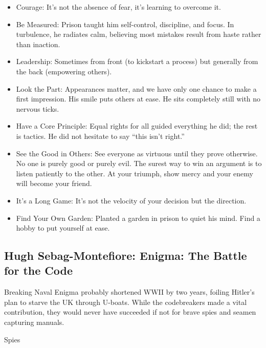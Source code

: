\documentclass[
]{article}
\begin{document}
\begin{itemize}
\item
  Courage: It's not the absence of fear, it's learning to overcome it.
\item
  Be Measured: Prison taught him self-control, discipline, and focus. In
  turbulence, he radiates calm, believing most mistakes result from
  haste rather than inaction.
\item
  Leadership: Sometimes from front (to kickstart a process) but
  generally from the back (empowering others).
\item
  Look the Part: Appearances matter, and we have only one chance to make
  a first impression. His smile puts others at ease. He sits completely
  still with no nervous ticks.
\item
  Have a Core Principle: Equal rights for all guided everything he did;
  the rest is tactics. He did not hesitate to say ``this isn't right.''
\item
  See the Good in Others: See everyone as virtuous until they prove
  otherwise. No one is purely good or purely evil. The surest way to win
  an argument is to listen patiently to the other. At your triumph, show
  mercy and your enemy will become your friend.
\item
  It's a Long Game: It's not the velocity of your decision but the
  direction.
\item
  Find Your Own Garden: Planted a garden in prison to quiet his mind.
  Find a hobby to put yourself at ease.
\end{itemize}

\hypertarget{hugh-sebag-montefiore-enigma-the-battle-for-the-code}{%
\subsection{Hugh Sebag-Montefiore: Enigma: The Battle for the
Code}\label{hugh-sebag-montefiore-enigma-the-battle-for-the-code}}

Breaking Naval Enigma probably shortened WWII by two years, foiling
Hitler's plan to starve the UK through U-boats. While the codebreakers
made a vital contribution, they would never have succeeded if not for
brave spies and seamen capturing manuals.

Spies
\end{document}
